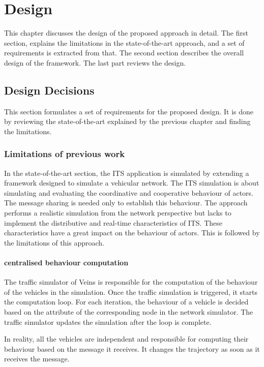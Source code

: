\chapter{Design}
This chapter discusses the design of the proposed approach in detail. The first section, explains the limitations in the state-of-the-art approach, and a set of requirements is extracted from that. The second section describes the overall design of the framework. The last part reviews the design.

\section{Design Decisions}
This section formulates a set of requirements for the proposed design. It is done by reviewing the state-of-the-art explained by the previous chapter and finding the limitations.

\subsection{Limitations of previous work}
In the state-of-the-art section, the ITS application is simulated by extending a framework designed to simulate a vehicular network. The ITS simulation is about simulating and evaluating the coordinative and cooperative behaviour of actors. The message sharing is needed only to establish this behaviour. The approach performs a realistic simulation from the network perspective but lacks to implement the distributive and real-time characteristics of ITS. These characteristics have a great impact on the behaviour of actors. This is followed by the limitations of this approach.

\subsubsection{centralised behaviour computation}
The traffic simulator of Veins is responsible for the computation of the behaviour of the vehicles in the simulation. Once the traffic simulation is triggered, it starts the computation loop. For each iteration, the behaviour of a vehicle is decided based on the attribute of the corresponding node in the network simulator. The traffic simulator updates the simulation after the loop is complete. 

In reality, all the vehicles are independent and responsible for computing their behaviour based on the message it receives. It changes the trajectory as soon as it receives the message. 

